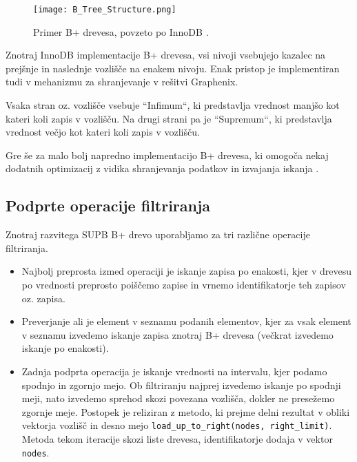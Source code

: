 \documentclass[a4paper,12pt,openright]{book}
\begin{document}
        \begin{figure}[H]
            \centerline{\texttt{[image: B\_Tree\_Structure.png]}}
            \caption{Primer B+ drevesa, povzeto po InnoDB \cite{BPTREE_INNODB}.}
            \label{btree_innodb}
        \end{figure}

        \noindent
        Znotraj InnoDB implementacije B+ drevesa, vsi nivoji vsebujejo kazalec na prejšnje in naslednje vozlišče na enakem nivoju. Enak pristop je implementiran tudi v mehanizmu za shranjevanje v rešitvi Graphenix. 
        
        Vsaka stran oz. vozlišče vsebuje ``Infimum``, ki predstavlja vrednost manjšo kot kateri koli zapis v vozlišču. Na drugi strani pa je ``Supremum``, ki predstavlja vrednost večjo kot kateri koli zapis v vozlišču.

        Gre še za malo bolj napredno implementacijo B+ drevesa, ki omogoča nekaj dodatnih optimizacij z vidika shranjevanja podatkov in izvajanja iskanja \cite{BPTREE_INNODB}.
        
        \subsection{Podprte operacije filtriranja}
        
        Znotraj razvitega SUPB B+ drevo uporabljamo za tri različne operacije filtriranja.
        \begin{itemize}
            \item Najbolj preprosta izmed operaciji je iskanje zapisa po enakosti, kjer v drevesu po vrednosti preprosto poiščemo zapise in vrnemo identifikatorje teh zapisov oz. zapisa.
            \item Preverjanje ali je element v seznamu podanih elementov, kjer za vsak element v seznamu izvedemo iskanje zapisa znotraj B+ drevesa (večkrat izvedemo iskanje po enakosti).
            \item Zadnja podprta operacija je iskanje vrednosti na intervalu, kjer podamo spodnjo in zgornjo mejo. Ob filtriranju najprej izvedemo iskanje po spodnji meji, nato izvedemo sprehod skozi povezana vozlišča, dokler ne presežemo zgornje meje. Postopek je reliziran z metodo, ki prejme delni rezultat v obliki vektorja vozlišč in desno mejo {\tt load\_up\_to\_right(nodes, right\_limit)}. Metoda tekom iteracije skozi liste drevesa, identifikatorje dodaja v vektor {\tt nodes}.
        \end{itemize}
\end{document}
